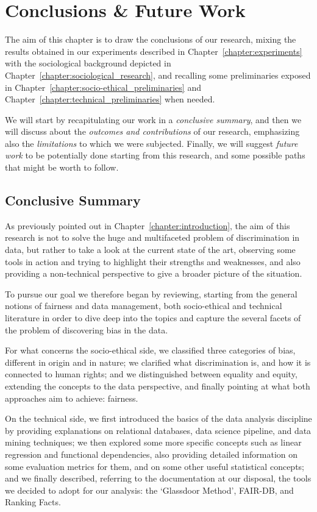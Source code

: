 \chapter{Conclusions \& Future Work}
\label{chapter:conclusions_future_work}
\thispagestyle{empty}

The aim of this chapter is to draw the conclusions of our research, mixing the results obtained in our experiments described in Chapter~\ref{chapter:experiments} with the sociological background depicted in Chapter~\ref{chapter:sociological_research}, and recalling some preliminaries exposed in Chapter~\ref{chapter:socio-ethical_preliminaries} and Chapter~\ref{chapter:technical_preliminaries} when needed.

We will start by recapitulating our work in a \textit{conclusive summary}, and then we will discuss about the \textit{outcomes and contributions} of our research, emphasizing also the \textit{limitations} to which we were subjected. Finally, we will suggest \textit{future work} to be potentially done starting from this research, and some possible paths that might be worth to follow.


\section{Conclusive Summary}
As previously pointed out in Chapter~\ref{chapter:introduction}, the aim of this research is not to solve the huge and multifaceted problem of discrimination in data, but rather to take a look at the current state of the art, observing some tools in action and trying to highlight their strengths and weaknesses, and also providing a non-technical perspective to give a broader picture of the situation.

To pursue our goal we therefore began by reviewing, starting from the general notions of fairness and data management, both socio-ethical and technical literature in order to dive deep into the topics and capture the several facets of the problem of discovering bias in the data.

For what concerns the socio-ethical side, we classified three categories of bias, different in origin and in nature; we clarified what discrimination is, and how it is connected to human rights; and we distinguished between equality and equity, extending the concepts to the data perspective, and finally pointing at what both approaches aim to achieve: fairness.

On the technical side, we first introduced the basics of the data analysis discipline by providing explanations on relational databases, data science pipeline, and data mining techniques; we then explored some more specific concepts such as linear regression and functional dependencies, also providing detailed information on some evaluation metrics for them, and on some other useful statistical concepts; and we finally described, referring to the documentation at our disposal, the tools we decided to adopt for our analysis: the `Glassdoor Method', FAIR-DB, and Ranking Facts.

